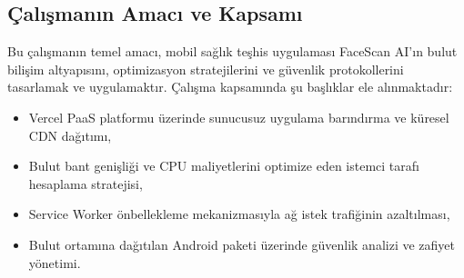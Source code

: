 \subsection{Çalışmanın Amacı ve Kapsamı}

Bu çalışmanın temel amacı, mobil sağlık teşhis uygulaması FaceScan AI'ın bulut bilişim altyapısını, optimizasyon stratejilerini ve güvenlik protokollerini tasarlamak ve uygulamaktır. Çalışma kapsamında şu başlıklar ele alınmaktadır:
\begin{itemize}
  \item Vercel PaaS platformu üzerinde sunucusuz uygulama barındırma ve küresel CDN dağıtımı,
  \item Bulut bant genişliği ve CPU maliyetlerini optimize eden istemci tarafı hesaplama stratejisi,
  \item Service Worker önbellekleme mekanizmasıyla ağ istek trafiğinin azaltılması,
  \item Bulut ortamına dağıtılan Android paketi üzerinde güvenlik analizi ve zafiyet yönetimi.
\end{itemize}

